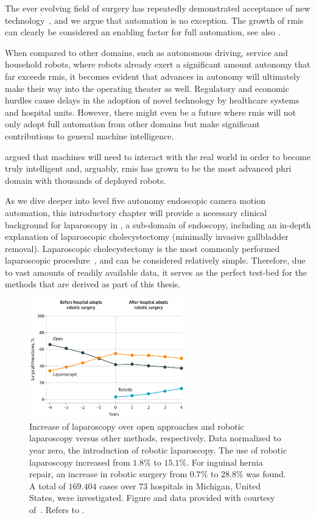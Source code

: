 The ever evolving field of surgery has repeatedly demonstrated acceptance of new technology~\cite{attanasio2021autonomoy}, and we argue that automation is no exception. The growth of \gls{rmis} can clearly be considered an enabling factor for full automation, see also .

When compared to other domains, such as autonomous driving, service and household robots, where robots already exert a significant amount autonomy that far exceeds \gls{rmis}, it becomes evident that advances in autonomy will ultimately make their way into the operating theater as well. Regulatory and economic hurdles cause delays in the adoption of novel technology by healthcare systems and hospital units. However, there might even be a future where \gls{rmis} will not only adopt full automation from other domains but make significant contributions to general machine intelligence. 

\citet{lecun2022path}
argued that machines will need to interact with the real world in order to become truly intelligent and, arguably, \gls{rmis} has grown to be the most advanced \gls{phri} domain with thousands of deployed robots.

As we dive deeper into level five autonomy endoscopic camera motion automation, this introductory chapter will provide a necessary clinical background for laparoscopy in , a sub-domain of endoscopy, including an in-depth explanation of laparoscopic cholecystectomy (minimally invasive gallbladder removal). Laparoscopic cholecystectomy is the most commonly performed laparoscopic procedure~\cite{sheetz2020trends}, and can be considered relatively simple. Therefore, due to vast amounts of readily available data, it serves as the perfect test-bed for the methods that are derived as part of this thesis. 
\begin{figure}[tbh]
    \centering
    \includegraphics[width=0.6\textwidth]{introduction/img/robotic_since_introduction.png}
    \caption{Increase of laparoscopy over open approaches and robotic laparoscopy versus other methods, respectively. Data normalized to year zero, the introduction of robotic laparoscopy. The use of robotic laparoscopy increased from $1.8\%$ to $15.1\%$. For inguinal hernia repair, an increase in robotic surgery from $0.7\%$ to $28.8\%$ was found. A total of $169.404$ cases over 73 hospitals in Michigan, United States, were investigated. Figure and data provided with courtesy of~\cite{sheetz2020trends}. Refers to .}
    \label{in:fig:robotic_vs_laparoscopic_vs_open}
\end{figure}

